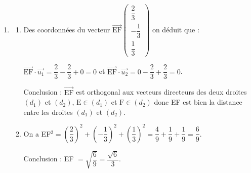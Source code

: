 \documentclass[10pt]{article}
\providecommand{\vect}[1]{\overrightarrow{#1}}
\begin{document}
\begin{enumerate}
\begin{enumerate}
$-2\times 0 + 1 + t + 5(2 + t) + 5 = 0 \iff 1 + t + 10 + 5t + 5 = 0\iff 6t + 16 = 0 \iff t = - \dfrac83$, d'où en remplaçant dans $x,\,y,\,$ et $z$, on obtient   F\:$\left(0~;~- \dfrac53~;~-\dfrac23\right)$.

Soit $(\delta)$ la droite passant par F et de vecteur directeur $\vect{w}$. On admet que les droites $(\delta)$ et $(d_1)$ sont sécantes en un point E de coordonnées $\left( -\dfrac23~;~- \dfrac43~;~-1\right)$.
	\end{enumerate}
\item 
	\begin{enumerate}
		\item 
Des coordonnées du vecteur $\vect{\text{EF}}\begin{pmatrix}\dfrac23\\-\dfrac13\\\dfrac13\end{pmatrix}$ on  déduit que :

$\vect{\text{EF}} \cdot \vect{u_1} = \dfrac23 - \dfrac23 + 0 = 0$ et 
$\vect{\text{EF}} \cdot \vect{u_2} = 0  - \dfrac23 + \dfrac23 = 0$.

Conclusion : $\vect{\text{EF}}$ est orthogonal aux vecteurs directeurs des deux droites $(d_1)$ et $(d_2)$, $\text{E} \in (d_1)$ et $\text{F} \in (d_2)$ donc EF est bien la distance entre les droites $(d_1)$ et $(d_2)$.
		\item 
		On a EF$^2 = \left(\dfrac23\right)^2 +  \left(-\dfrac13\right)^2 +  \left(\dfrac13 \right)^2  = \dfrac49 + \dfrac19 + \dfrac19 = \dfrac69$.
		
		Conclusion : EF $ = \sqrt{\dfrac69} = \dfrac{\sqrt{6}}{3}$.
	\end{enumerate}
\end{enumerate}
\end{document}
